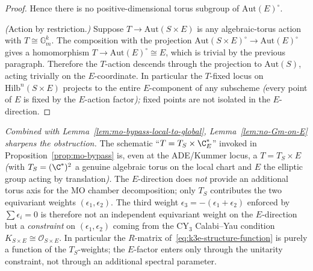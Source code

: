 \begin{proof}
Hence there is no positive-dimensional torus subgroup of
$\mathrm{Aut}(E)^\circ$.

\textit{(}Action by restriction.\textit{)} Suppose
$T \to \mathrm{Aut}(S \times E)$ is any algebraic-torus action
with $T \cong \mathbb{G}_m^k$. The composition with the
projection $\mathrm{Aut}(S \times E)^\circ \to \mathrm{Aut}(E)^\circ$
gives a homomorphism $T \to \mathrm{Aut}(E)^\circ \cong E$,
which is trivial by the previous paragraph. Therefore the
$T$-action descends through the projection to $\mathrm{Aut}(S)$,
acting trivially on the $E$-coordinate. In particular the
$T$-fixed locus on $\mathrm{Hilb}^n(S \times E)$ projects to
the entire $E$-component of any subscheme \emph{(}every point of
$E$ is fixed by the $E$-action factor\emph{);} fixed points are
not isolated in the $E$-direction.
\end{proof}

\begin{remark}
\label{rem:no-E-axis-chamber}
\textit{Combined with Lemma~\ref{lem:mo-bypass-local-to-global},
Lemma~\ref{lem:no-Gm-on-E} sharpens the obstruction.} The
schematic ``$T = T_S \times \C^*_E$'' invoked in
Proposition~\ref{prop:mo-bypass} is, even at the ADE/Kummer
locus, a $T = T_S \times E$ \emph{(}with $T_S = (\C^*)^2$ a genuine
algebraic torus on the local chart and $E$ the elliptic
group acting by translation\emph{).} The $E$-direction does
\emph{not} provide an additional torus axis for the MO chamber
decomposition; only $T_S$ contributes the two equivariant
weights $(\epsilon_1, \epsilon_2)$. The third weight
$\epsilon_3 = -(\epsilon_1 + \epsilon_2)$ enforced by
$\sum \epsilon_i = 0$ is therefore not an independent
equivariant weight on the $E$-direction but a
\emph{constraint} on $(\epsilon_1, \epsilon_2)$ coming from
the CY$_3$ Calabi--Yau condition $K_{S \times E} \cong
\mathcal{O}_{S \times E}$. In particular the $R$-matrix
of~\eqref{eq:k3e-structure-function} is purely a function of
the $T_S$-weights; the $E$-factor enters only through the
unitarity constraint, not through an additional spectral parameter.
\end{remark}


